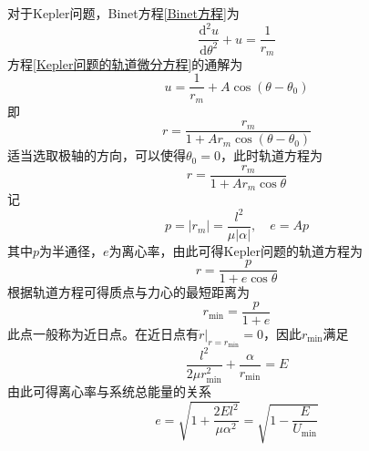 对于Kepler问题，Binet方程\eqref{Binet方程}为
\begin{equation}
	\frac{\mathrm{d}^2 u}{\mathrm{d} \theta^2} + u = \frac{1}{r_m}
	\label{Kepler问题的轨道微分方程}
\end{equation}
方程\eqref{Kepler问题的轨道微分方程}的通解为
\begin{equation*}
	u = \frac{1}{r_m} + A\cos(\theta-\theta_0)
\end{equation*}
即
\begin{equation*}
	r = \frac{r_m}{1+Ar_m \cos (\theta-\theta_0)}
\end{equation*}
适当选取极轴的方向，可以使得$\theta_0=0$，此时轨道方程为
\begin{equation*}
	r = \frac{r_m}{1+Ar_m \cos \theta}
\end{equation*}
记
\begin{equation*}
	p = |r_m| = \frac{l^2}{\mu |\alpha|},\quad e = Ap
\end{equation*}
其中$p$为{\heiti 半通径}，$e$为{\heiti 离心率}，由此可得Kepler问题的轨道方程为
\begin{equation}
	r = \frac{p}{1+e\cos \theta}
	\label{Kepler问题的轨道方程}
\end{equation}
根据轨道方程可得质点与力心的最短距离为
\begin{equation*}
	r_{\mathrm{min}} = \frac{p}{1+e}
\end{equation*}
此点一般称为{\heiti 近日点}。在近日点有$\dot{r}\big|_{r=r_{\mathrm{min}}} = 0$，因此$r_{\mathrm{min}}$满足
\begin{equation*}
	\frac{l^2}{2\mu r_{\mathrm{min}}^2} + \frac{\alpha}{r_{\mathrm{min}}} = E
\end{equation*}
由此可得离心率与系统总能量的关系
\begin{equation*}
	e = \sqrt{1+\frac{2El^2}{\mu\alpha^2}} = \sqrt{1-\frac{E}{U_{\mathrm{min}}}}
\end{equation*}

